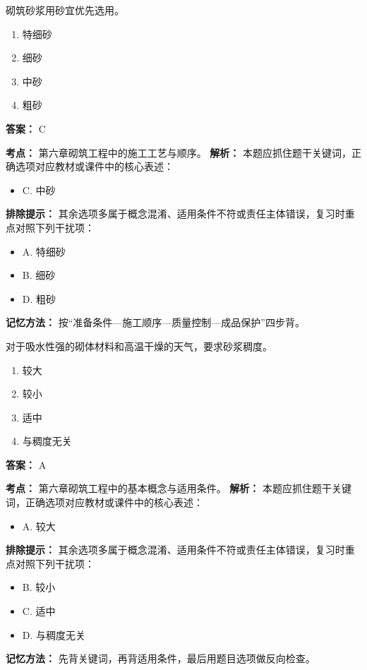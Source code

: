 \documentclass[UTF8,fontset=fandol,11pt]{ctexart}
\begin{document}
\begin{quizbox}[title={第 2 题}]
砌筑砂浆用砂宜优先选用。\\
\begin{enumerate}[label=\Alph*.]
\item 特细砂
\item 细砂
\item 中砂
\item 粗砂
\end{enumerate}
\textbf{答案：} C
\vspace{0.25em}
\begin{answerbox}[title={考点解析}]
\textbf{考点：} 第六章砌筑工程中的施工工艺与顺序。
\textbf{解析：} 本题应抓住题干关键词，正确选项对应教材或课件中的核心表述：
\begin{itemize}
\item C. 中砂
\end{itemize}
\textbf{排除提示：} 其余选项多属于概念混淆、适用条件不符或责任主体错误，复习时重点对照下列干扰项：
\begin{itemize}
\item A. 特细砂
\item B. 细砂
\item D. 粗砂
\end{itemize}
\textbf{记忆方法：} 按“准备条件—施工顺序—质量控制—成品保护”四步背。
\end{answerbox}
\end{quizbox}

\vspace{0.2em}

\begin{quizbox}[title={第 3 题}]
对于吸水性强的砌体材料和高温干燥的天气，要求砂浆稠度。\\
\begin{enumerate}[label=\Alph*.]
\item 较大
\item 较小
\item 适中
\item 与稠度无关
\end{enumerate}
\textbf{答案：} A
\vspace{0.25em}
\begin{answerbox}[title={考点解析}]
\textbf{考点：} 第六章砌筑工程中的基本概念与适用条件。
\textbf{解析：} 本题应抓住题干关键词，正确选项对应教材或课件中的核心表述：
\begin{itemize}
\item A. 较大
\end{itemize}
\textbf{排除提示：} 其余选项多属于概念混淆、适用条件不符或责任主体错误，复习时重点对照下列干扰项：
\begin{itemize}
\item B. 较小
\item C. 适中
\item D. 与稠度无关
\end{itemize}
\textbf{记忆方法：} 先背关键词，再背适用条件，最后用题目选项做反向检查。
\end{answerbox}
\end{quizbox}
\end{document}
